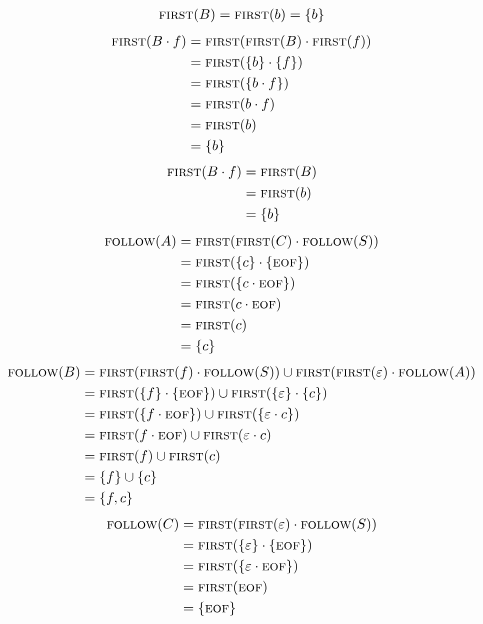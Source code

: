 \documentclass{report}
\newcommand{\Null}{\varepsilon}
\newcommand{\Seq}{\cdot}
\newcommand{\FIRST}{\textsc{first}}
\newcommand{\FOLLOW}{\textsc{follow}}
\newcommand{\EOF}{\textsc{eof}}
\newcommand{\NT}[1]{{#1}}
\newcommand{\T}[1]{{#1}}
\begin{document}
      \begin{align*}
        \FIRST(\NT{B}) &= \FIRST(\T{b}) = \{\T{b}\} \\
      \end{align*}
      \begin{align*}
        \FIRST(\NT{B} \Seq \T{f}) &= \FIRST(\FIRST(\NT{B}) \Seq \FIRST(\T{f})) \\
        &= \FIRST(\{\T{b}\} \Seq \{\T{f}\})\\
        &= \FIRST(\{\T{b} \Seq \T{f}\})\\
        &= \FIRST(\T{b} \Seq \T{f})\\
        &= \FIRST(\T{b})\\
        &= \{\T{b}\}
      \end{align*}
      \begin{align*}
        \FIRST(\NT{B} \Seq \T{f}) &= \FIRST(\NT{B})\\
        &= \FIRST(\T{b})\\
        &= \{\T{b}\}
      \end{align*}
      \begin{align*}
        \FOLLOW(\NT{A}) &= \FIRST(\FIRST(\NT{C}) \Seq \FOLLOW(\NT{S})) \\
        &= \FIRST(\{\T{c}\} \Seq \{\EOF\})\\
        &= \FIRST(\{\T{c} \Seq \EOF\})\\
        &= \FIRST(\T{c} \Seq \EOF) \\
        &= \FIRST(\T{c}) \\
        &= \{\T{c}\}
      \end{align*}
      \begin{align*}
        \FOLLOW(\NT{B}) &= \FIRST(\FIRST(\T{f}) \Seq \FOLLOW(\NT{S})) \cup \FIRST(\FIRST(\Null) \Seq \FOLLOW(\NT{A})) \\
        &= \FIRST(\{\T{f}\} \Seq \{\EOF\}) \cup \FIRST(\{\Null\} \Seq \{\T{c}\}) \\
        &= \FIRST(\{\T{f} \Seq \EOF\}) \cup \FIRST(\{\Null \Seq \T{c}\}) \\
        &= \FIRST(\T{f} \Seq \EOF) \cup \FIRST(\Null \Seq \T{c}) \\
        &= \FIRST(\T{f}) \cup \FIRST(\T{c})\\
        &= \{\T{f}\} \cup \{\T{c}\}\\
        &= \{\T{f}, \T{c}\}
      \end{align*}
      \begin{align*}
        \FOLLOW(\NT{C}) &= \FIRST(\FIRST(\Null) \Seq \FOLLOW(\NT{S})) \\
        &= \FIRST(\{\Null\} \Seq \{\EOF\})\\
        &= \FIRST(\{\Null \Seq \EOF\})\\
        &= \FIRST(\EOF) \\
        &= \{\EOF\}
      \end{align*}
\end{document}
